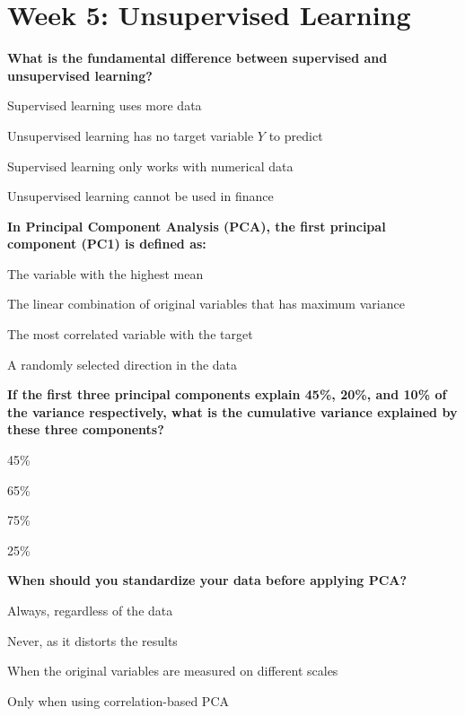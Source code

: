 \documentclass[11pt]{article}
\begin{document}
\section*{Week 5: Unsupervised Learning}

\begin{questions}[resume]

\item \textbf{What is the fundamental difference between supervised and unsupervised learning?}
\begin{options}
  \item Supervised learning uses more data
  \item Unsupervised learning has no target variable $Y$ to predict
  \item Supervised learning only works with numerical data
  \item Unsupervised learning cannot be used in finance
\end{options}

\item \textbf{In Principal Component Analysis (PCA), the first principal component (PC1) is defined as:}
\begin{options}
  \item The variable with the highest mean
  \item The linear combination of original variables that has maximum variance
  \item The most correlated variable with the target
  \item A randomly selected direction in the data
\end{options}

\item \textbf{If the first three principal components explain 45\%, 20\%, and 10\% of the variance respectively, what is the cumulative variance explained by these three components?}
\begin{options}
  \item 45\%
  \item 65\%
  \item 75\%
  \item 25\%
\end{options}

\item \textbf{When should you standardize your data before applying PCA?}
\begin{options}
  \item Always, regardless of the data
  \item Never, as it distorts the results
  \item When the original variables are measured on different scales
  \item Only when using correlation-based PCA
\end{options}


\end{questions}
\end{document}
